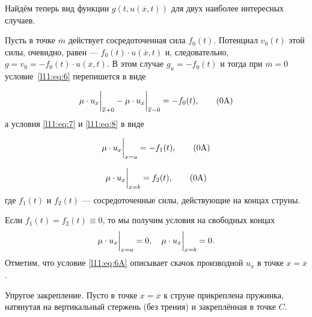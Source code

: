 \documentclass[12pt,a4paper,openany,fleqn]{book}
\theoremstyle{definition}
\begin{document}
Найдём теперь вид функции $g(t,u(\overline{x},t))$ для двух наиболее интересных случаев.
\begin{enumerateA}
	\item\label{l11:enum:A} Пусть в точке $\overline{m}$ действует сосредоточенная сила $f_0(t)$. Потенциал $v_0(t)$ этой силы, очевидно, равен --- $f_0(t)\cdot u(\overline{x},t)$ и, следовательно, $g=v_0=-f_0(t)\cdot u(\overline{x},t)$. В этом случае $g_u=-f_0(t)$ и тогда при $\overline{m}=0$ условие~\eqref{l11:eq:6} перепишется в виде 
	\addtocounter{equation}{-2}
	\begin{equation}
		\label{l11:eq:6A}
		\hfill\mu\cdot u_x\bigg|_{\overline{x}+0}-\mu\cdot u_x\bigg|_{\overline{x}-0}=-f_0(t), \tag{\theequation{}A}\hfill
	\end{equation} 
	а условия \eqref{l11:eq:7} и \eqref{l11:eq:8} в виде
	\addtocounter{equation}{1} 
	\begin{equation}
		\label{l11:eq:7A}
		\hfill\mu\cdot u_x\bigg|_{x=a}=-f_1(t),\tag{\theequation{}A}\hfill
	\end{equation}
	\vspace{-0.2cm}\addtocounter{equation}{1}
		\begin{equation}
		\label{l11:eq:8A}
		\hfill\mu\cdot u_x\bigg|_{x=b}=f_2(t),\tag{\theequation{}A}\hfill
	\end{equation}
	где $f_1(t)$ и $f_2(t)$ --- сосредоточенные силы, действующие на концах струны. 
	
	\noindent Если $f_1(t)=f_2(t)\equiv0$, то мы получим условия на свободных концах
	\begin{equation}
		\label{l11:eq:9}
		\hfill \mu\cdot u_x\bigg|_{x=a}=0,\quad\mu\cdot u_x\bigg|_{x=b}=0.\hfill
	\end{equation}
	Отметим, что условие \eqref{l11:eq:6A} описывает скачок производной $u_x$ в точке $x=\overline{x}$.
	\item Упругое закрепление. Пусто в точке $x=\overline{x}$ к струне прикреплена пружинка, натянутая на вертикальный стержень (без трения) и закреплённая в точке $C$.
	
	
	\begin{tikzpicture}[x=0.75pt,y=0.75pt,yscale=-1,xscale=1]
		

\end{tikzpicture}
\end{enumerateA}
\end{document}
